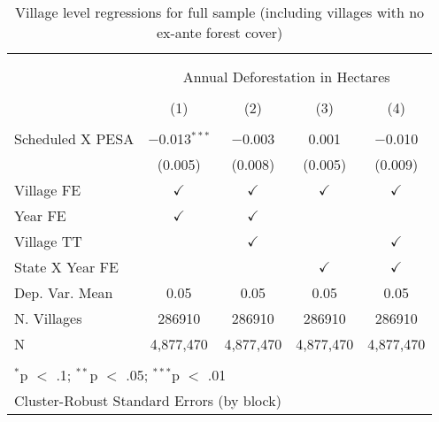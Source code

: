 
\begin{table}[!htbp] \centering 
  \caption{Village level regressions for full sample (including villages with no ex-ante forest cover)} 
  \label{table:fullsamp} 
\begin{tabular}{@{\extracolsep{0pt}}lcccc} 
\\[-1.8ex]\hline \\[-1.8ex] 
\\[-1.8ex] & \multicolumn{4}{c}{Annual Deforestation in Hectares} \\ 
\\[-1.8ex] & (1) & (2) & (3) & (4)\\ 
\hline \\[-1.8ex] 
 Scheduled X PESA & $-$0.013$^{***}$ & $-$0.003 & 0.001 & $-$0.010 \\ 
  & (0.005) & (0.008) & (0.005) & (0.009) \\ 
 Village FE & $\checkmark$ & $\checkmark$ & $\checkmark$ & $\checkmark$ \\ 
Year FE & $\checkmark$ & $\checkmark$ &  &  \\ 
Village TT &  & $\checkmark$ &  & $\checkmark$ \\ 
State X Year FE &  &  & $\checkmark$ & $\checkmark$ \\ 
Dep. Var. Mean & 0.05 & 0.05 & 0.05 & 0.05 \\ 
N. Villages & 286910 & 286910 & 286910 & 286910 \\ 
N & 4,877,470 & 4,877,470 & 4,877,470 & 4,877,470 \\ 
\hline \\[-1.8ex] 
\multicolumn{5}{l}{$^{*}$p $<$ .1; $^{**}$p $<$ .05; $^{***}$p $<$ .01} \\ 
\multicolumn{5}{l}{Cluster-Robust Standard Errors (by block)} \\ 
\end{tabular} 
\end{table} 
